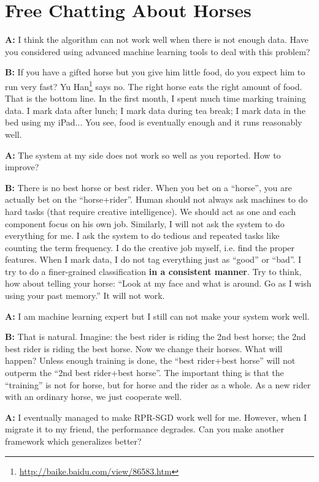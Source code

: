 \documentclass{sig-alternate}
\begin{document}
\section{Free Chatting About Horses}
\label{sec:Free Chatting}

\textbf{A:}
I think the algorithm can not work well 
when there is not enough data. 
Have you considered using advanced machine learning tools 
to deal with this problem? 

\textbf{B:} 
If you have a gifted horse but you give him little food, 
do you expect him to run very fast?
Yu Han\footnote{\url{http://baike.baidu.com/view/86583.htm}}
says no. 
The right horse eats the right amount of food. 
That is the bottom line. 
In the first month, I spent much time marking training data. 
I mark data after lunch; I mark data during tea break; 
I mark data in the bed using my iPad... 
You see, food is eventually enough and it runs reasonably well. 

\textbf{A:}
The system at my side does not work so well as you reported. 
How to improve?

\textbf{B:}
There is no best horse or best rider.
When you bet on a ``horse'', you are actually bet on the ``horse+rider''. 
Human should not always ask machines to do hard tasks
(that require creative intelligence). 
We should act as one and each component focus on his own job. 
Similarly, I will not ask the system to do everything for me. 
I ask the system to do tedious and repeated tasks like counting the term frequency. 
I do the creative job myself, i.e. find the proper features. 
When I mark data, I do not tag everything just as ``good'' or ``bad''. 
I try to do a finer-grained classification {\bf in a consistent manner}. 
Try to think, how about telling your horse:
``Look at my face and what is around. 
Go as I wish using your past memory.''
It will not work. 

\textbf{A:}
I am machine learning expert but I still can not make your system work well. 

\textbf{B:}
That is natural. 
Imagine: the best rider is riding the 2nd best horse;
the 2nd best rider is riding the best horse. 
Now we change their horses. 
What will happen? 
Unless enough training is done, 
the ``best rider+best horse'' will not outperm 
the ``2nd best rider+best horse''. 
The important thing is that the ``training'' is not for horse, 
but for horse and the rider as a whole. 
As a new rider with an ordinary horse, we just cooperate well. 

\textbf{A:}
I eventually managed to make RPR-SGD work well for me. 
However, when I migrate it to my friend, 
the performance degrades. 
Can you make another framework which generalizes better?
\end{document}
